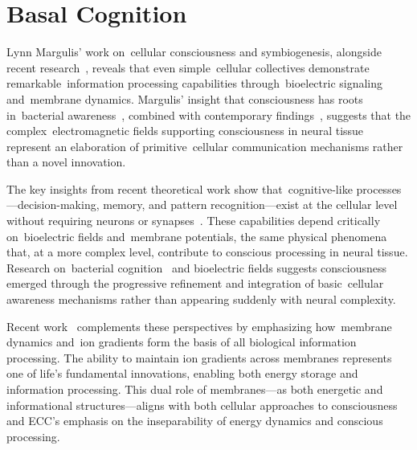 \section{Basal Cognition~}

Lynn Margulis' work on~cellular consciousness and symbiogenesis, alongside recent research~\cite{Lyon2015, lyon2021reframing}, reveals that even simple~cellular collectives demonstrate remarkable~information processing capabilities through~bioelectric signaling and~membrane dynamics. Margulis' insight that consciousness has roots in~bacterial awareness~\cite{Margulis2001, maturana1991autopoiesis}, combined with contemporary findings~\cite{Baluska2016, Fields2020}, suggests that the complex~electromagnetic fields supporting consciousness in neural tissue represent an elaboration of primitive~cellular communication mechanisms rather than a novel innovation.

The key insights from recent theoretical work show that~cognitive-like processes—decision-making, memory, and pattern recognition—exist at the cellular level without requiring neurons or synapses~\cite{Shapiro2007, Baluska2016}. These capabilities depend critically on~bioelectric fields and~membrane potentials, the same physical phenomena that, at a more complex level, contribute to conscious processing in neural tissue. Research on~bacterial cognition~\cite{vanDuijn2006, lyon2021reframing} and bioelectric fields suggests consciousness emerged through the progressive refinement and integration of basic~cellular awareness mechanisms rather than appearing suddenly with neural complexity.

Recent work~\cite{Lane2015, lane2010life} complements these perspectives by emphasizing how~membrane dynamics and~ion gradients form the basis of all biological information processing. The ability to maintain ion gradients across membranes represents one of life's fundamental innovations, enabling both energy storage and information processing. This dual role of membranes—as both energetic and informational structures—aligns with both cellular approaches to consciousness and ECC's emphasis on the inseparability of energy dynamics and conscious processing.

